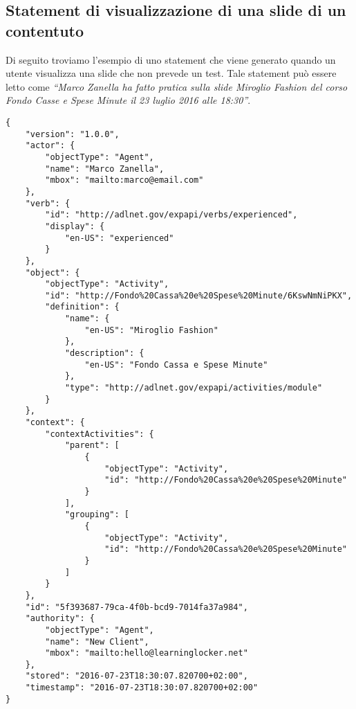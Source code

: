 	\subsection{Statement di visualizzazione di una slide di un contentuto}
    Di seguito troviamo l'esempio di uno statement che viene generato quando un utente visualizza una slide che non prevede un test. Tale statement può essere letto come \textit{``Marco Zanella ha fatto pratica sulla slide Miroglio Fashion del corso Fondo Casse e Spese Minute il 23 luglio 2016 alle 18:30''}.
\begin{lstlisting}
{
    "version": "1.0.0",
    "actor": {
        "objectType": "Agent",
        "name": "Marco Zanella",
        "mbox": "mailto:marco@email.com"
    },
    "verb": {
        "id": "http://adlnet.gov/expapi/verbs/experienced",
        "display": {
            "en-US": "experienced"
        }
    },
    "object": {
        "objectType": "Activity",
        "id": "http://Fondo%20Cassa%20e%20Spese%20Minute/6KswNmNiPKX",
        "definition": {
            "name": {
                "en-US": "Miroglio Fashion"
            },
            "description": {
                "en-US": "Fondo Cassa e Spese Minute"
            },
            "type": "http://adlnet.gov/expapi/activities/module"
        }
    },
    "context": {
        "contextActivities": {
            "parent": [
                {
                    "objectType": "Activity",
                    "id": "http://Fondo%20Cassa%20e%20Spese%20Minute"
                }
            ],
            "grouping": [
                {
                    "objectType": "Activity",
                    "id": "http://Fondo%20Cassa%20e%20Spese%20Minute"
                }
            ]
        }
    },
    "id": "5f393687-79ca-4f0b-bcd9-7014fa37a984",
    "authority": {
        "objectType": "Agent",
        "name": "New Client",
        "mbox": "mailto:hello@learninglocker.net"
    },
    "stored": "2016-07-23T18:30:07.820700+02:00",
    "timestamp": "2016-07-23T18:30:07.820700+02:00"
}
\end{lstlisting}
    
